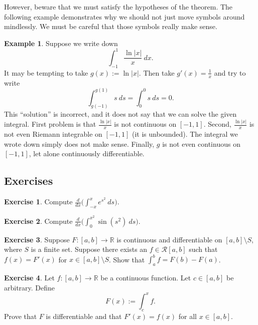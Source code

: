 \documentclass[12pt]{book}
\newcommand{\abs}[1]{\left\lvert {#1} \right\rvert}
\newcommand{\R}{{\mathbb{R}}}
\newcommand{\sR}{{\mathcal{R}}}
\theoremstyle{plain}
\theoremstyle{remark}
\theoremstyle{definition}
\theoremstyle{exercise}
\newtheorem{exercise}{Exercise}[section]
\theoremstyle{example}
\newtheorem{example}[thm]{Example}
\begin{document}
However, beware that we must satisfy the hypotheses of the theorem.  The
following example demonstrates why we should not just 
move symbols around mindlessly.
We must be careful that those symbols really make sense.

\begin{example}
Suppose we write down
\begin{equation*}
\int_{-1}^{1} \frac{\ln \abs{x}}{x} ~dx .
\end{equation*}
It may be tempting to take $g(x) := \ln \abs{x}$.  Then take $g'(x) =
\frac{1}{x}$ and try to write
\begin{equation*}
\int_{g(-1)}^{g(1)} s ~ds = 
\int_{0}^{0} s ~ds = 0. 
\end{equation*}
This ``solution'' is incorrect, and it does not say
that we can solve the given integral.  First problem is that
$\frac{\ln \abs{x}}{x}$ is not continuous on $[-1,1]$.
Second, $\frac{\ln \abs{x}}{x}$ is not even Riemann integrable on $[-1,1]$
(it is unbounded).
The integral we wrote down simply does not make sense.
Finally, $g$ is not even continuous 
on $[-1,1]$, let alone continuously differentiable.
\end{example}

\subsection{Exercises}

\begin{exercise}
Compute
$\displaystyle
\frac{d}{dx} \biggl( \int_{-x}^x e^{s^2}~ds \biggr)$.
\end{exercise}

\begin{exercise}
Compute
$\displaystyle
\frac{d}{dx} \biggl( \int_{0}^{x^2} \sin(s^2)~ds \biggr)$.
\end{exercise}

\begin{exercise}
Suppose $F \colon [a,b] \to \R$ is continuous and differentiable
on $[a,b] \setminus S$, where $S$ is a finite set.  Suppose there
exists an $f \in \sR[a,b]$ such that $f(x) = F'(x)$ for $x \in [a,b]
\setminus S$.  Show that
$\int_a^b f = F(b)-F(a)$.
\end{exercise}

\begin{exercise} \label{secondftc:exercise}
Let $f \colon [a,b] \to \R$ be a continuous function.  Let $c \in [a,b]$
be arbitrary.  Define
\begin{equation*}
F(x) := \int_c^x f .
\end{equation*}
Prove that $F$ is differentiable and that $F'(x) = f(x)$ for all $x \in
[a,b]$.
\end{exercise}
\end{document}

